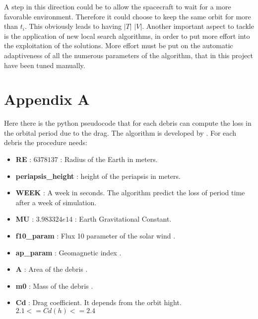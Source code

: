 \documentclass[a4paper,9pt,journal,twoside,compsoc]{PPIEEEtran}
\begin{document}
A step in this direction could be to allow the spacecraft to wait for a more favorable environment. Therefore it could choose to keep the same orbit for more than $t_i$. This obviously leads to having $|T|$  $|V|$.
Another important aspect to tackle is the application of new local search algorithms, in order to put more effort into the exploitation of the solutions. More effort must be put on the automatic adaptiveness of all the numerous parameters of the algorithm, that in this project have been tuned manually.



\section{Appendix A}
Here there is the python pseudocode that for each debris can compute the loss in the orbital period due to the drag. The algorithm is developed by \cite{australia}. For each debris the procedure needs:
\begin{itemize}
\item \textbf{RE} : $ 6378137 $ : Radius of the Earth in meters.
\item \textbf{periapsis\_height} : height of the periapsis in meters.
\item \textbf{WEEK} : A week in seconds. The algorithm predict the loss of period time after a week of simulation.
\item \textbf{MU} :  $3.983324e14$ : Earth Gravitational Constant.
\item \textbf{f10\_param} : Flux 10 parameter of the solar wind \cite{f10flux}.
\item \textbf{ap\_param} : Geomagnetic index \cite{ap}. 
\item \textbf{A} : Area of the debris \cite{act}.
\item \textbf{m0} : Mass of the debris \cite{act}.
\item \textbf{Cd} : Drag coefficient. It depends from the orbit hight. $ 2.1 <= Cd(h) <= 2.4 $ 
\end{itemize}
\end{document}
